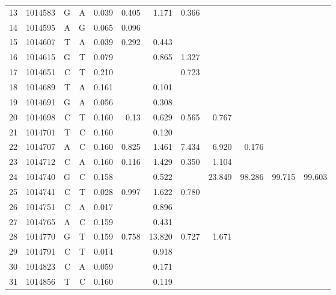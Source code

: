 \documentclass{bmcart}
\begin{document}
\begin{table}[htbp]
\begin{threeparttable}
\begin{tabular}{rrrrrrrrrrrr}
    13    & 1014583 & G     & A     & 0.039 & 0.405 & 1.171 & 0.366 &       &       &       &  \\
    14    & 1014595 & A     & G     & 0.065 & 0.096 &       &       &       &       &       &  \\
    15    & 1014607 & T     & A     & 0.039 & 0.292 & 0.443 &       &       &       &       &  \\
    16    & 1014615 & G     & T     & 0.079 &       & 0.865 & 1.327 &       &       &       &  \\
    17    & 1014651 & C     & T     & 0.210 &       &       & 0.723 &       &       &       &  \\
    18    & 1014689 & T     & A     & 0.161 &       & 0.101 &       &       &       &       &  \\
    19    & 1014691 & G     & A     & 0.056 &       & 0.308 &       &       &       &       &  \\
    20    & 1014698 & C     & T     & 0.160 & 0.13  & 0.629 & 0.565 & 0.767 &       &       &  \\
    21    & 1014701 & T     & C     & 0.160 &       & 0.120 &       &       &       &       &  \\
    22    & 1014707 & A     & C     & 0.160 & 0.825 & 1.461 & 7.434 & 6.920 & 0.176 &       &  \\
    23    & 1014712 & C     & A     & 0.160 & 0.116 & 1.429 & 0.350 & 1.104 &       &       &  \\
    24    & 1014740 & G     & C     & 0.158 &       & 0.522 &       & 23.849 & 98.286 & 99.715 & 99.603 \\
    25    & 1014741 & C     & T     & 0.028 & 0.997 & 1.622 & 0.780 &       &       &       &  \\
    26    & 1014751 & C     & A     & 0.017 &       & 0.896 &       &       &       &       &  \\
    27    & 1014765 & A     & C     & 0.159 &       & 0.431 &       &       &       &       &  \\
    28    & 1014770 & G     & T     & 0.159 & 0.758 & 13.820 & 0.727 & 1.671 &       &       &  \\
    29    & 1014791 & C     & T     & 0.014 &       & 0.918 &       &       &       &       &  \\
    30    & 1014823 & C     & A     & 0.059 &       & 0.171 &       &       &       &       &  \\
    31    & 1014856 & T     & C     & 0.160 &       & 0.119 &       &       &       &       &  \\

\end{tabular}
\end{threeparttable}
\end{table}
\end{document}
